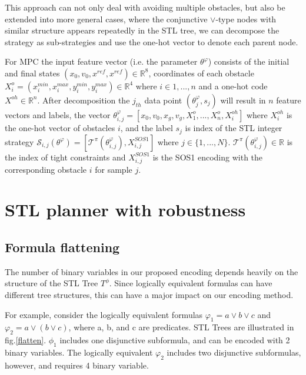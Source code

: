 \documentclass[a4paper]{report}
\begin{document}
This approach can not only deal with avoiding multiple obstacles, but also be extended into more general cases, where the conjunctive $\vee$-type nodes with similar structure appears repeatedly in the STL tree, we can decompose the strategy as sub-strategies and use the one-hot vector to denote each parent node.

For MPC the input feature vector (i.e. the parameter $\theta^\varphi$) consists of the initial and final states $(x_0,v_0,x^{ref},x^{ref}) \in \mathbb{R}^8$, coordinates of each obstacle $X_i^o=(x_{i}^{min},x_{i}^{max},y_{i}^{min},y_{i}^{max}) \in \mathbb{R}^4$ where $i \in{1,...,n}$ and a one-hot code $X^{oh} \in \mathbb{R}^n$. After decomposition the $j_{th} $ data point $(\theta_j^{\varphi}, s_j)$ will result in $n$ feature vectors and labels, the vector $\theta_{i,j}^{\varphi} = [x_0,v_0,x_g,v_g,X_1^o,...,X_n^o,X_i^{oh}]$ where $X_i^{oh}$ is the one-hot vector of obstacles $i$, and the label $s_j$ is index of the STL integer strategy $\mathcal{S}_{i,j}(\theta^{\varphi})= [\mathcal{T}^{\pi}(\theta_{i,j}^{\varphi}), X_{i,j}^{SOS1}]$ where $j \in\{1,...,N\}$. $\mathcal{T}^{\pi}(\theta_{i,j}^{\varphi})\in \mathbb{R}$ is the index of tight constraints and $X_{i,j}^{SOS1}$ is the SOS1 encoding with the corresponding obstacle $i$ for sample $j$.

\section{STL planner with robustness}
\label{STL_planner}
\subsection{Formula flattening}

The number of binary variables in our proposed encoding depends heavily on the structure of the STL Tree $T^\phi$. Since logically equivalent
formulas can have different tree structures, this can have a major impact on our encoding method.

For example, consider the logically equivalent formulas $\varphi_1=a\vee b \vee c$ and $\varphi_2=a\vee (b \vee c)$, where a, b, and c are predicates. STL Trees are illustrated in fig.\ref{flatten}. $\phi_1$ includes one disjunctive subformula, and can be encoded with 2 binary variables. The logically equivalent $\varphi_2$ includes two disjunctive subformulas, however, and requires 4 binary variable.
\end{document}
